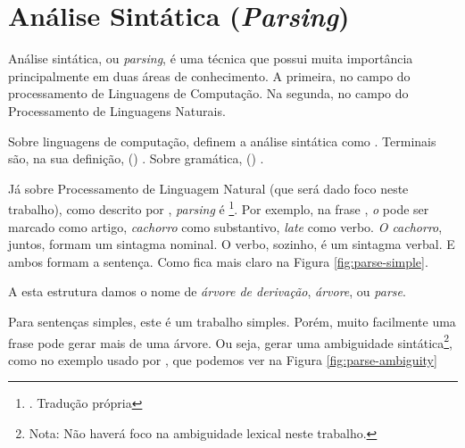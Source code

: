 \section{Análise Sintática (\textit{Parsing})}
\label{sec:parsing}

Análise sintática, ou \textit{parsing}, é uma técnica que possui muita importância principalmente em duas áreas de conhecimento. A primeira, no campo do processamento de Linguagens de Computação. Na segunda, no campo do Processamento de Linguagens Naturais.

Sobre linguagens de computação,  definem a análise sintática como . Terminais são, na sua definição, (\textit{}) . Sobre gramática, (\textit{}) . 

Já sobre Processamento de Linguagem Natural (que será dado foco neste trabalho), como descrito por , \textit{parsing} é  \footnote{. Tradução própria}. Por exemplo, na frase , \textit{o} pode ser marcado como artigo, \textit{cachorro} como substantivo, \textit{late} como verbo. \textit{O cachorro}, juntos, formam um sintagma nominal. O verbo, sozinho, é um sintagma verbal. E ambos formam a sentença. Como fica mais claro na Figura \ref{fig:parse-simple}.

\begin{center}
    
\end{center}

A esta estrutura damos o nome de \textit{árvore de derivação}, \textit{árvore}, ou \textit{parse}.

Para sentenças simples, este é um trabalho simples. Porém, muito facilmente uma frase pode gerar mais de uma árvore. Ou seja, gerar uma ambiguidade sintática\footnote{Nota: Não haverá foco na ambiguidade lexical neste trabalho.}, como no exemplo usado por , que podemos ver na Figura \ref{fig:parse-ambiguity}

\begin{center}
    
\end{center}

